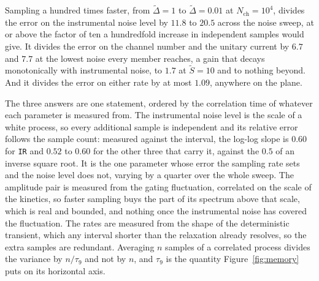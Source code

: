 Sampling a hundred times faster, from $\widetilde{\Delta}=1$ to $\widetilde{\Delta}=0.01$ at
$N_{\mathrm{ch}}=10^{4}$, divides the error on the instrumental noise level by $11.8$ to $20.5$
across the noise sweep, at or above the factor of ten a hundredfold increase in independent samples
would give. It divides the error on the channel number and the unitary current by $6.7$ and $7.7$ at
the lowest noise every member reaches, a gain that decays monotonically with instrumental noise, to
$1.7$ at $\widetilde{S}=10$ and to nothing beyond. And it divides the error on either rate by at
most $1.09$, anywhere on the plane. %

The three answers are one statement, ordered by the correlation time of whatever each parameter is
measured from. The instrumental noise level is the scale of a white process, so every additional
sample is independent and its relative error follows the sample count: measured against the
interval, the log-log slope is $0.60$ for \texttt{IR} and $0.52$ to $0.60$ for the other three that
carry it, against the $0.5$ of an inverse square root. It is the one parameter whose error the
sampling rate sets and the noise level does not, varying by a quarter over the whole sweep. %
The amplitude pair is measured from the gating fluctuation, correlated on the scale of the kinetics,
so faster sampling buys the part of its spectrum above that scale, which is real and bounded, and
nothing once the instrumental noise has covered the fluctuation. The rates are measured from the
shape of the deterministic transient, which any interval shorter than the relaxation already
resolves, so the extra samples are redundant. Averaging $n$ samples of a correlated process divides
the variance by $n/\tau_{9}$ and not by $n$, and $\tau_{9}$ is the quantity Figure~\ref{fig:memory}
puts on its horizontal axis.

